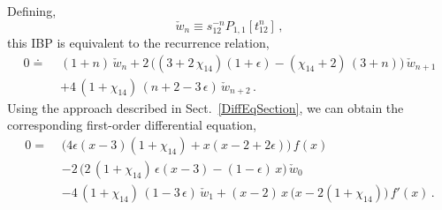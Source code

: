 \documentclass[aps,prd,preprint,groupedaddress,nofootinbib,showpacs,eqsecnum]{revtex4}
\def\sect#1{Sect.~{\ref{#1}}}
\def\eps{\epsilon}
\def\Pn#1#2{P_{#1,#2}}
\begin{document}
\def\ws{\check{w}}
Defining,
\begin{equation}
\ws_n \equiv s_{12}^{-n}\Pn11[t_{12}^n]\,,
\end{equation}
this IBP is equivalent to the recurrence relation,
\begin{equation}
\begin{aligned}
0 \doteq\,\, &
  (1+n)\,\ws_{n}
  +2\,\bigl((3+2\,\chi_{14})(1+\eps)-(\chi_{14}+2)\,(3+n)\bigr)\,\ws_{n+1}
  \\ &
  +4\,(1+\chi_{14})\,(n+2-3\,\eps)\,\ws_{n+2}
\,.
\end{aligned}
\label{SlashedBoxRecursion}
\end{equation}
Using the approach described in \sect{DiffEqSection}, we can obtain 
the corresponding first-order differential equation,
\begin{equation}
\begin{aligned}
0 =\,\,&
\bigl(4 \eps (x-3) (1 + \chi_{14})
+x (x-2 + 2 \eps)\bigr)\,f(x)
\\&
-2\,\bigl(2\,(1+\chi_{14})\,\eps (x-3)-(1-\eps)\,x\bigr)\,\ws_0
\\ &
-4\,(1+\chi_{14})\,(1-3\,\eps)\,\ws_1
+(x-2)\,x\,\bigl(x-2(1+\chi_{14})\bigr)\,f'(x)
\,.
\end{aligned}
\end{equation}
\end{document}
